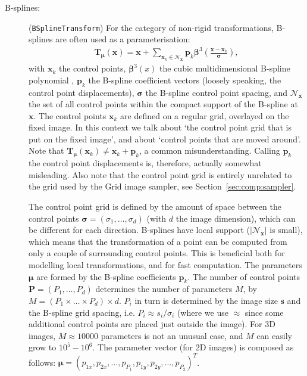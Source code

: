 \documentclass[]{report}
\newcommand{\vx}{\bm{x}}
\newcommand{\vmu}{\bm{\mu}}
\newcommand{\vTm}{\bm{T}_{\vmu}}
\newcommand{\vTmx}{\bm{T}_{\vmu}(\bm{x})}
\newcommand{\Ncal}{\mathcal{N}}
\begin{document}
\begin{description}
\item[B-splines:] (\texttt{BSplineTransform}) For the category of non-rigid
    transformations, B-splines \citep{RueckertEA99} are often used as a
    parameterisation:
\begin{align}
\vTmx = \vx + \sum_{\vx_k \in \Ncal_{\vx}} \bm{p}_k
\bm{\beta}^3\left( \frac{\vx - \vx_k}{\bm{\sigma}}
\right),\label{eq:bspline}
\end{align}
with $\vx_k$ the control points, $\bm{\beta}^3(x)$ the cubic
multidimensional B-spline polynomial \citep{Unser99}, $\bm{p}_k$ the
B-spline coefficient vectors (loosely speaking, the control point
displacements), $\bm{\sigma}$ the B-spline control point spacing,
and $\Ncal_{\vx}$ the set of all control points within the compact
support of the B-spline at $\vx$. The control points $\vx_k$ are
defined on a regular grid, overlayed on the fixed image. In this
context we talk about `the control point grid that is put on the
fixed image', and about `control points that are moved around'. Note
that $\vTm(\vx_k)\neq \vx_k + \bm{p}_k$, a common misunderstanding.
Calling $\bm{p}_k$ the control point displacements is, therefore,
actually somewhat misleading. Also note that the control point grid
is entirely unrelated to the grid used by the Grid image sampler,
see Section~\ref{sec:comp:sampler}.

The control point grid is defined by the amount of space between the
control points $\bm{\sigma} = (\sigma_1, \ldots, \sigma_d)$ (with
$d$ the image dimension), which can be different for each direction.
B-splines have local support ($|\Ncal_{\vx}|$ is small), which means
that the transformation of a point can be computed from only a
couple of surrounding control points. This is beneficial both for
modelling local transformations, and for fast computation. The
parameters $\vmu$ are formed by the B-spline coefficients
$\bm{p}_k$. The number of control points $\bm{P} = (P_1, \ldots,
P_d)$ determines the number of parameters $M$, by $M = ( P_1 \times
\ldots \times P_d ) \times d$. $P_i$ in turn is determined by the
image size $\bm{s}$ and the B-spline grid spacing, i.e. $P_i \approx
s_i / \sigma_i$ (where we use $\approx$ since some additional
control points are placed just outside the image). For 3D images, $M
\approx 10000$ parameters is not an unusual case, and $M$ can easily
grow to $10^5 - 10^6$. The parameter vector (for 2D images) is
composed as follows: $\vmu = (p_{1x}, p_{2x}, \ldots, p_{P_1},
p_{1y}, p_{2y}, \ldots, p_{P_2} )^T$.


\end{description}
\end{document}
